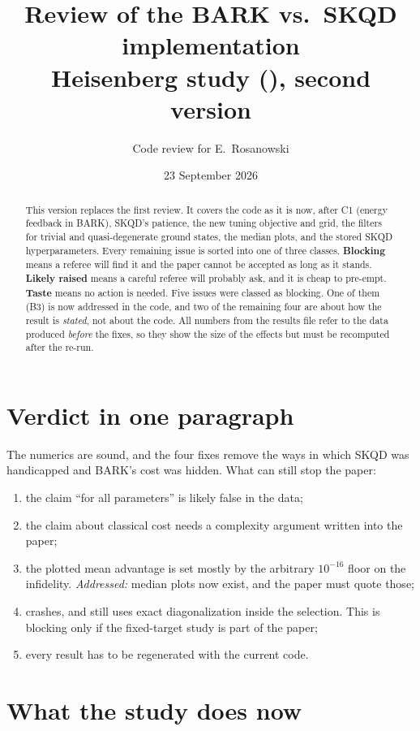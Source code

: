 \documentclass[11pt,a4paper]{article}
\title{Review of the BARK vs.\ SKQD implementation\\[2pt]
\large Heisenberg study (\code{EqualNumberOfBitstrings.py}), second version}
\author{Code review for E.~Rosanowski}
\date{23 September 2026}
\newcommand{\code}[1]{\texttt{\detokenize{#1}}}
\begin{document}
\maketitle

\begin{abstract}
This version replaces the first review. It covers the code as it is now,
after C1 (energy feedback in BARK), SKQD's patience, the new tuning objective and
grid, the filters for trivial and quasi-degenerate ground states, the median
plots, and the stored SKQD hyperparameters. Every remaining issue is sorted
into one of three classes. \textbf{Blocking} means a referee will find it and
the paper cannot be accepted as long as it stands. \textbf{Likely raised} means
a careful referee will probably ask, and it is cheap to pre-empt.
\textbf{Taste} means no action is needed.
Five issues were classed as blocking. One of them (B3) is now addressed in the
code, and two of the remaining four are about how the result is \emph{stated},
not about the code. All numbers from the results file refer to the data
produced \emph{before} the fixes, so they show the size of the effects but
must be recomputed after the re-run.
\end{abstract}

\section*{Verdict in one paragraph}
The numerics are sound, and the four fixes remove the ways in which SKQD was
handicapped and BARK's cost was hidden. What can still stop the paper:
\begin{enumerate}[noitemsep]
  \item[B1] the claim ``for all parameters'' is likely false in the data;
  \item[B2] the claim about classical cost needs a complexity argument written into the paper;
  \item[B3] the plotted mean advantage is set mostly by the arbitrary $10^{-16}$ floor on the infidelity. \emph{Addressed:} median plots now exist, and the paper must quote those;
  \item[B4] \code{BARK.sweep} crashes, and still uses exact diagonalization inside the selection. This is blocking only if the fixed-target study is part of the paper;
  \item[B5] every result has to be regenerated with the current code.
\end{enumerate}

\section{What the study does now}
\end{document}
